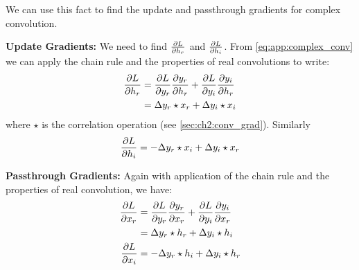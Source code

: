 We can use this fact to find the update and passthrough gradients for complex
convolution.

\textbf{Update Gradients:} We need to find $\frac{\partial L}{\partial h_r}$ and $\frac{\partial L}{\partial h_i}$.
From \eqref{eq:app:complex_conv} we can apply the chain rule and the properties
of real convolutions to write:
\begin{align}
  \frac{\partial L}{\partial h_r} &= \frac{\partial L}{\partial y_r}\frac{\partial y_r}{\partial h_r} + \frac{\partial L}{\partial y_i}\frac{\partial y_i}{\partial h_r} \\
                &= \Delta y_r \star x_r + \Delta y_i \star x_i
\end{align}
where $\star$ is the correlation operation (see \autoref{sec:ch2:conv_grad}).
Similarly 
\begin{equation}
  \frac{\partial L}{\partial h_i} = -\Delta y_r \star x_i + \Delta y_i \star x_r
\end{equation}

\textbf{Passthrough Gradients:} Again with application of the chain rule and the
properties of real convolution, we have:
\begin{align}
  \frac{\partial L}{\partial x_r} &= \frac{\partial L}{\partial y_r}\frac{\partial y_r}{\partial x_r} + \frac{\partial L}{\partial y_i}\frac{\partial y_i}{\partial x_r} \\
                &= \Delta y_r \star h_r + \Delta y_i \star h_i \\
  \frac{\partial L}{\partial x_i} &= -\Delta y_r \star h_i + \Delta y_i \star h_r
\end{align}

